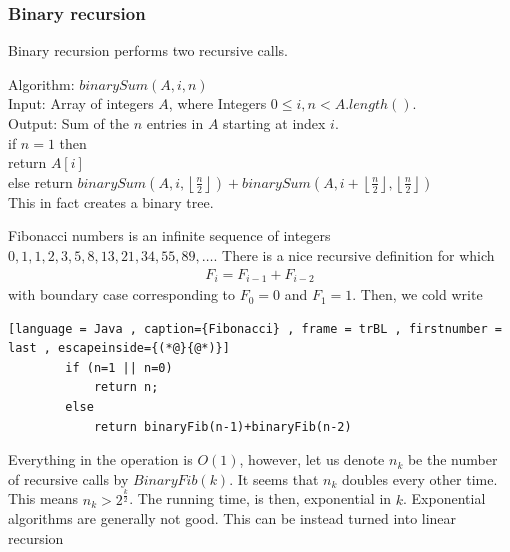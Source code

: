 \documentclass[a4paper]{article}
\theoremstyle{plain}
\theoremstyle{definition}
\newtheorem{exmp}{Example}[section]
\theoremstyle{remark}
\begin{document}
\subsubsection{Binary recursion}
Binary recursion performs two recursive calls. 
\begin{tcolorbox}[colback=black!3!white,colframe=black!60!white,title=\begin{exmp}Integer array A adder \label{Integer array A adder}\end{exmp}]
        Algorithm: $binarySum(A,i,n)$ \\
	Input: Array of integers $A$, where Integers $0\le i, n<A.length()$. \\
	Output: Sum of the $n$ entries in $A$ starting at index $i$.\\
	if $n=1$ then\\
		return $A[i]$\\
	else
		return $binarySum(A,i,\left\lfloor \frac{n}{2} \right\rfloor) + binarySum(A,i+\left\lfloor \frac{n}{2} \right\rfloor, \left\lfloor \frac{n}{2} \right\rfloor)$ \\
		This in fact creates a binary tree.
\end{tcolorbox}
\begin{tcolorbox}[colback=black!3!white,colframe=black!60!white,title=\begin{exmp}Fibonacci \label{Fibonacci}\end{exmp}]
        Fibonacci numbers is an infinite sequence of integers $0,1,1,2,3,5,8,13,21,34,55,89,\ldots$. There is a nice recursive definition for which
                \begin{align}
                F_i = F_{i-1}+F_{i-2}
                \end{align}
		with boundary case corresponding to $F_0=0$ and $F_1=1$.
		Then, we cold write
		\begin{lstlisting}[language = Java , caption={Fibonacci} , frame = trBL , firstnumber = last , escapeinside={(*@}{@*)}]
		if (n=1 || n=0)
			return n;
		else
			return binaryFib(n-1)+binaryFib(n-2)
		\end{lstlisting}
		Everything in the operation is $O(1)$, however, let us denote $n_k$ be the number of recursive calls by $BinaryFib(k)$. It seems that $n_k$ doubles every other time. This means $n_k > 2^{\frac{k}{2}}$. The running time, is then, exponential in $k$. Exponential algorithms are generally not good. This can be instead turned into linear recursion
	
\end{tcolorbox}
\end{document}
